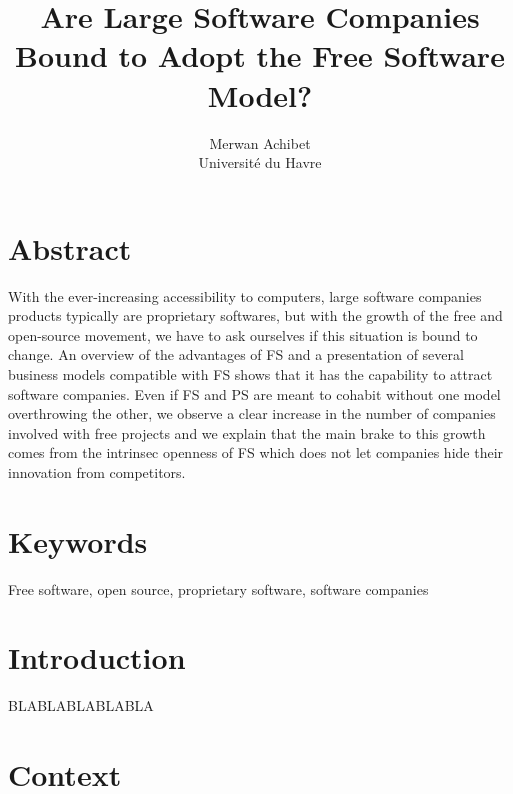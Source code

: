 \documentclass[12pt]{article}
\title{Are Large Software Companies Bound to Adopt the Free Software Model?}
\author{Merwan Achibet\\Université du Havre}
\date{}
\begin{document}
\maketitle
\newpage

\tableofcontents
\newpage

\section*{Abstract}

With the ever-increasing accessibility to computers, large software companies products typically are
proprietary softwares, but with the growth of the free and open-source movement,
we have to ask ourselves if this situation is bound to change. An overview of the advantages of FS and a presentation of several business models compatible with FS shows that it has the capability to attract software companies. Even if FS and PS are meant to cohabit without one model overthrowing the other, we observe a clear increase in the number of companies involved with free projects and we explain that the main brake to this growth comes from the intrinsec  openness of FS which does not let companies hide their innovation from competitors.

\section*{Keywords}

Free software, open source, proprietary software, software companies

\newpage

\section*{Introduction}

BLABLABLABLABLA

\section{Context}
\end{document}
